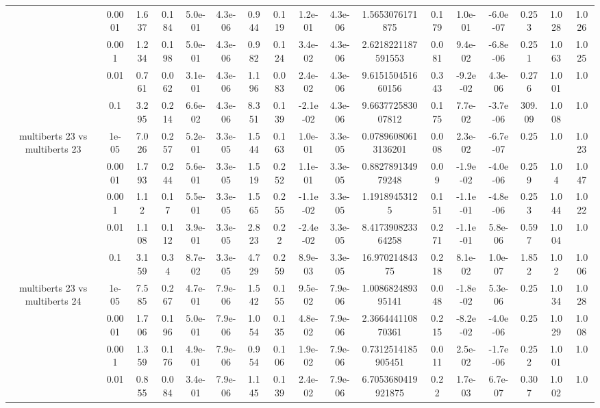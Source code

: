 \begin{tabular}{|c|c|c|c|c|c|c|c|c|c|c|c|c|c|c|c|c|}
 & 0.0001 & 1.637 & 0.184 & 5.0e-01 & 4.3e-06 & 0.944 & 0.119 & 1.2e-01 & 4.3e-06 & 1.5653076171875 & 0.179 & 1.0e-01 & -6.0e-07 & 0.253 & 1.028 & 1.026 \\
 & 0.001 & 1.234 & 0.198 & 5.0e-01 & 4.3e-06 & 0.982 & 0.124 & 3.4e-02 & 4.3e-06 & 2.6218221187591553 & 0.081 & 9.4e-02 & -6.8e-06 & 0.251 & 1.063 & 1.025 \\
 & 0.01 & 0.761 & 0.062 & 3.1e-01 & 4.3e-06 & 1.196 & 0.083 & 2.4e-02 & 4.3e-06 & 9.615150451660156 & 0.343 & -9.2e-02 & 4.3e-06 & 0.276 & 1.001 & 1.0 \\
 & 0.1 & 3.295 & 0.214 & 6.6e-02 & 4.3e-06 & 8.351 & 0.139 & -2.1e-02 & 4.3e-06 & 9.663772583007812 & 0.175 & 7.7e-02 & -3.7e-06 & 309.09 & 1.008 & 1.0 \\
\hline
\multirow{5}{*}{multiberts 23 vs multiberts 23} & 1e-05 & 7.026 & 0.257 & 5.2e-01 & 3.3e-05 & 1.544 & 0.163 & 1.0e-01 & 3.3e-05 & 0.07896080613136201 & 0.008 & 2.3e-02 & -6.7e-07 & 0.25 & 1.0 & 1.023 \\
 & 0.0001 & 1.793 & 0.244 & 5.6e-01 & 3.3e-05 & 1.519 & 0.252 & 1.1e-01 & 3.3e-05 & 0.882789134979248 & 0.09 & -1.9e-02 & -4.0e-06 & 0.259 & 1.04 & 1.047 \\
 & 0.001 & 1.12 & 0.17 & 5.5e-01 & 3.3e-05 & 1.565 & 0.255 & -1.1e-02 & 3.3e-05 & 1.19189453125 & 0.151 & -1.1e-01 & -4.8e-06 & 0.253 & 1.044 & 1.022 \\
 & 0.01 & 1.108 & 0.112 & 3.9e-01 & 3.3e-05 & 2.823 & 0.22 & -2.4e-02 & 3.3e-05 & 8.417390823364258 & 0.271 & -1.1e-01 & 5.8e-06 & 0.597 & 1.004 & 1.0 \\
 & 0.1 & 3.159 & 0.34 & 8.7e-02 & 3.3e-05 & 4.729 & 0.259 & 8.9e-03 & 3.3e-05 & 16.97021484375 & 0.218 & 8.1e-02 & 1.0e-07 & 1.852 & 1.02 & 1.006 \\
\hline
\multirow{5}{*}{multiberts 23 vs multiberts 24} & 1e-05 & 7.585 & 0.267 & 4.7e-01 & 7.9e-06 & 1.542 & 0.155 & 9.5e-02 & 7.9e-06 & 1.008682489395141 & 0.048 & -1.8e-02 & 5.3e-06 & 0.25 & 1.034 & 1.028 \\
 & 0.0001 & 1.706 & 0.196 & 5.0e-01 & 7.9e-06 & 1.054 & 0.135 & 4.8e-02 & 7.9e-06 & 2.366444110870361 & 0.215 & -8.2e-02 & -4.0e-06 & 0.25 & 1.029 & 1.008 \\
 & 0.001 & 1.359 & 0.176 & 4.9e-01 & 7.9e-06 & 0.954 & 0.106 & 1.9e-02 & 7.9e-06 & 0.7312514185905451 & 0.011 & 2.5e-02 & -1.7e-06 & 0.252 & 1.001 & 1.0 \\
 & 0.01 & 0.855 & 0.084 & 3.4e-01 & 7.9e-06 & 1.145 & 0.139 & 2.4e-02 & 7.9e-06 & 6.7053680419921875 & 0.22 & 1.7e-03 & 6.7e-07 & 0.307 & 1.002 & 1.0 \\

\end{tabular}
